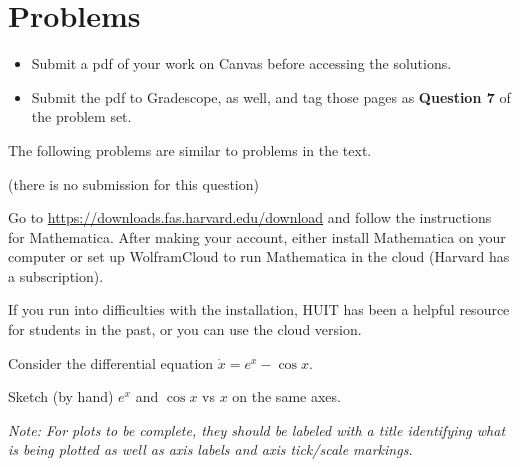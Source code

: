 \documentclass[12pt,letterpaper]{exam}
\begin{document}
\section*{Problems}
\begin{itemize}
\itemsep0pt
\item Submit a pdf of your work on Canvas before accessing the solutions.  
\item Submit the pdf to Gradescope, as well, and tag those pages as \textbf{Question 7} of the problem set.
\end{itemize}

\noindent The following problems are similar to problems in the text.
\begin{questions}
\setcounter{question}{-1}
\question (there is no submission for this question) 

Go to \url{https://downloads.fas.harvard.edu/download} and follow the instructions for Mathematica.  After making your account, either install Mathematica on your computer or set up WolframCloud to run Mathematica in the cloud (Harvard has a subscription).

If you run into difficulties with the installation, HUIT has been a helpful resource for students in the past, or you can use the cloud version.

\question Consider the differential equation $\dot{x} = e^x - \cos x$.  
\begin{parts}
\item Sketch (by hand) $e^x$ and $\cos x$ vs $x$ on the same axes.  

\emph{Note: For plots to be complete, they should be labeled with a title identifying what is being plotted as well as axis labels and axis tick/scale markings.}





\end{parts}
\end{questions}
\end{document}
